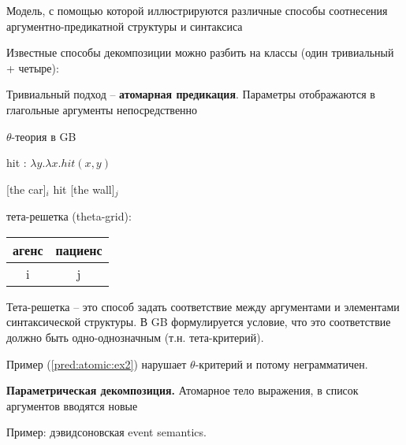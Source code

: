 \documentclass[10pt]{article}
\theoremstyle{example-style}
\begin{document}
Модель, с помощью которой иллюстрируются различные способы соотнесения аргументно-предикатной структуры и синтаксиса

\begin{exe}
 \label{pred:atomic}
\end{exe}

Известные способы декомпозиции можно разбить на классы (один тривиальный + четыре):

Тривиальный подход -- \textbf{атомарная предикация}. Параметры отображаются в глагольные аргументы непосредственно
\begin{exe}
 \label{pred:atomic:ex1}
\end{exe}

$\theta$-теория в GB

hit : $\lambda y . \lambda x . hit(x,y)$

[the car]$_i$ hit [the wall]$_j$

тета-решетка (theta-grid):

\begin{table}[ht]
\centering
\begin{tabular}{|c|c|}
\hline
агенс & пациенс \\ \hline
i     & j       \\ \hline
\end{tabular}
\end{table}

Тета-решетка -- это способ задать соответствие между аргументами и элементами синтаксической структуры. В GB формулируется условие, что это соответствие должно быть одно-однозначным (т.н. тета-критерий). 

\begin{exe}
   \label{pred:atomic:ex2}
\end{exe}

Пример (\ref{pred:atomic:ex2}) нарушает $\theta$-критерий и потому неграмматичен.

\textbf{Параметрическая декомпозиция.} Атомарное тело выражения, в список аргументов вводятся новые

\begin{exe}
\end{exe}

Пример: дэвидсоновская event semantics.
\end{document}
